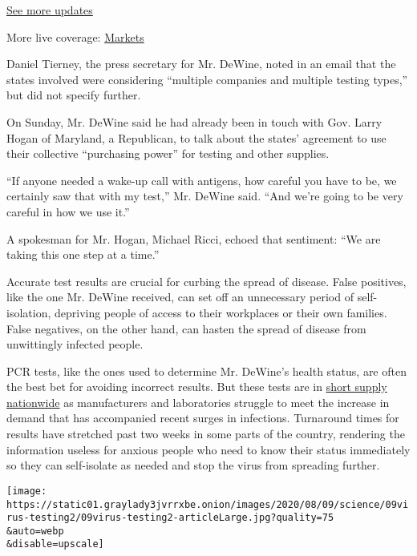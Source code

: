 \href{https://www.nytimes3xbfgragh.onion/2020/09/11/world/covid-19-coronavirus.html?action=click\&pgtype=Article\&state=default\&region=MAIN_CONTENT_1\&context=storylines_live_updates}{See
more updates}

More live coverage:
\href{https://www.nytimes3xbfgragh.onion/live/2020/09/11/business/stock-market-today-coronavirus?action=click\&pgtype=Article\&state=default\&region=MAIN_CONTENT_1\&context=storylines_live_updates}{Markets}

Daniel Tierney, the press secretary for Mr. DeWine, noted in an email
that the states involved were considering ``multiple companies and
multiple testing types,'' but did not specify further.

On Sunday, Mr. DeWine said he had already been in touch with Gov. Larry
Hogan of Maryland, a Republican, to talk about the states' agreement to
use their collective ``purchasing power'' for testing and other
supplies.

``If anyone needed a wake-up call with antigens, how careful you have to
be, we certainly saw that with my test,'' Mr. DeWine said. ``And we're
going to be very careful in how we use it.''

A spokesman for Mr. Hogan, Michael Ricci, echoed that sentiment: ``We
are taking this one step at a time.''

Accurate test results are crucial for curbing the spread of disease.
False positives, like the one Mr. DeWine received, can set off an
unnecessary period of self-isolation, depriving people of access to
their workplaces or their own families. False negatives, on the other
hand, can hasten the spread of disease from unwittingly infected people.

PCR tests, like the ones used to determine Mr. DeWine's health status,
are often the best bet for avoiding incorrect results. But these tests
are in
\href{https://www.nytimes3xbfgragh.onion/2020/07/23/health/coronavirus-testing-supply-shortage.html}{short
supply nationwide} as manufacturers and laboratories struggle to meet
the increase in demand that has accompanied recent surges in infections.
Turnaround times for results have stretched past two weeks in some parts
of the country, rendering the information useless for anxious people who
need to know their status immediately so they can self-isolate as needed
and stop the virus from spreading further.

\texttt{[image: https://static01.graylady3jvrrxbe.onion/images/2020/08/09/science/09virus-testing2/09virus-testing2-articleLarge.jpg?quality=75\\\&auto=webp\\\&disable=upscale]}


